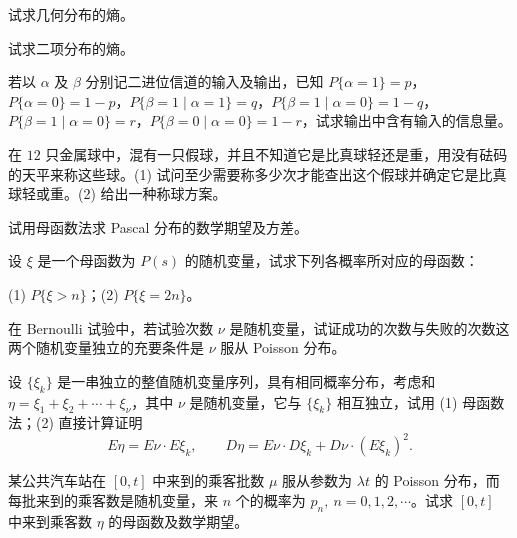 \documentclass[../../main.tex]{subfiles}
\begin{document}
\begin{exercise}\label{exercise:ch04-37}
试求几何分布的熵。
\end{exercise}

\begin{exercise}\label{exercise:ch04-38}
试求二项分布的熵。
\end{exercise}

\begin{exercise}\label{exercise:ch04-39}
若以 $\alpha$ 及 $\beta$ 分别记二进位信道的输入及输出，已知 $P\{\alpha=1\}=p$，$P\{\alpha=0\}=1-p$，$P\{\beta=1\mid\alpha=1\}=q$，$P\{\beta=1\mid\alpha=0\}=1-q$，$P\{\beta=1\mid\alpha=0\}=r$，$P\{\beta=0\mid\alpha=0\}=1-r$，试求输出中含有输入的信息量。
\end{exercise}

\begin{exercise}\label{exercise:ch04-40}
在 $12$ 只金属球中，混有一只假球，并且不知道它是比真球轻还是重，用没有砝码的天平来称这些球。(1) 试问至少需要称多少次才能查出这个假球并确定它是比真球轻或重。(2) 给出一种称球方案。
\end{exercise}

\begin{exercise}\label{exercise:ch04-41}
试用母函数法求 Pascal 分布的数学期望及方差。
\end{exercise}

\begin{exercise}\label{exercise:ch04-42}
设 $\xi$ 是一个母函数为 $P(s)$ 的随机变量，试求下列各概率所对应的母函数：

(1) $P\{\xi>n\}$；\qquad (2) $P\{\xi=2n\}$。
\end{exercise}

\begin{exercise}\label{exercise:ch04-43}
在 Bernoulli 试验中，若试验次数 $\nu$ 是随机变量，试证成功的次数与失败的次数这两个随机变量独立的充要条件是 $\nu$ 服从 Poisson 分布。
\end{exercise}

\begin{exercise}\label{exercise:ch04-44}
设 $\{\xi_k\}$ 是一串独立的整值随机变量序列，具有相同概率分布，考虑和 $\eta=\xi_1+\xi_2+\cdots+\xi_\nu$，其中 $\nu$ 是随机变量，它与 $\{\xi_k\}$ 相互独立，试用 (1) 母函数法；(2) 直接计算证明
\[
E\eta=E\nu\cdot E\xi_k,\qquad D\eta=E\nu\cdot D\xi_k+D\nu\cdot(E\xi_k)^2.
\]
\end{exercise}

\begin{exercise}\label{exercise:ch04-45}
某公共汽车站在 $[0,t]$ 中来到的乘客批数 $\mu$ 服从参数为 $\lambda t$ 的 Poisson 分布，而每批来到的乘客数是随机变量，来 $n$ 个的概率为 $p_n,\ n=0,1,2,\cdots$。试求 $[0,t]$ 中来到乘客数 $\eta$ 的母函数及数学期望。
\end{exercise}
\end{document}
